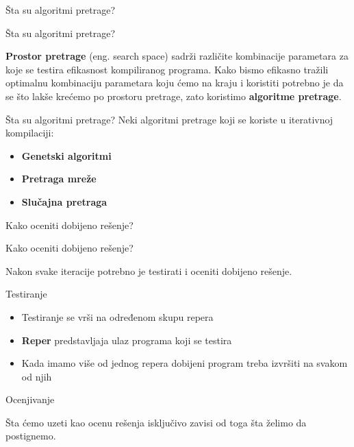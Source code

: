 \documentclass[10pt]{beamer}
\begin{document}
\begin{frame}[standout]
  Šta su algoritmi pretrage?
\end{frame}
\begin{frame}[fragile]{Šta su algoritmi pretrage?}

\textbf{Prostor pretrage} (eng. search space) sadrži različite kombinacije parametara za koje se testira efikasnost kompiliranog 
programa. Kako bismo efikasno tražili optimalnu kombinaciju parametara koju ćemo na kraju i koristiti potrebno je da se što 
lakše krećemo po prostoru pretrage, zato koristimo \textbf{algoritme pretrage}.
\end{frame}

\begin{frame}[fragile]{Šta su algoritmi pretrage?}
Neki algoritmi pretrage koji se koriste u iterativnoj kompilaciji:
\begin{itemize}[<+- | alert@+>]
    \item \textbf{Genetski algoritmi}
    \item \textbf{Pretraga mreže}
    \item \textbf{Slučajna pretraga}

  \end{itemize}
\end{frame}

\begin{frame}[standout]
  Kako oceniti dobijeno rešenje?
\end{frame}

\begin{frame}{Kako oceniti dobijeno rešenje?}
  
  Nakon svake iteracije potrebno je testirati i oceniti dobijeno rešenje.

\end{frame}

\begin{frame}{Testiranje}

  \begin{itemize}[<+- | alert@+>]
    \item Testiranje se vrši na određenom skupu repera
    \item \textbf{Reper} predstavljaja ulaz programa koji se testira
    \item Kada imamo više od jednog repera dobijeni program treba izvršiti na svakom od njih
  \end{itemize}

\end{frame}

\begin{frame}{Ocenjivanje}

   Šta ćemo uzeti kao ocenu rešenja isključivo zavisi od toga šta želimo da postignemo.

\end{frame}
\end{document}
